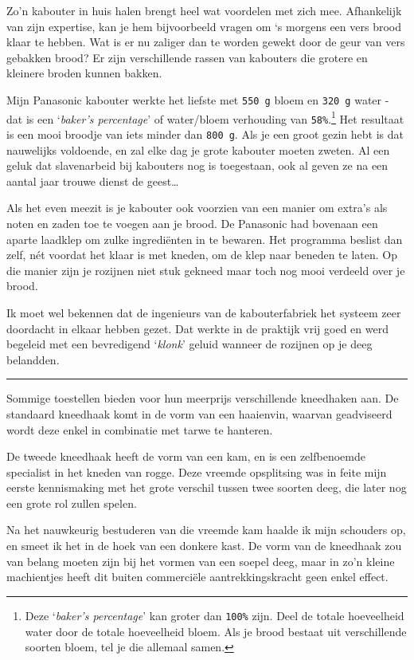 \documentclass[
  11pt,
  dutch,
]{memoir}
\begin{document}
Zo'n kabouter in huis halen brengt heel wat voordelen met zich mee.
Afhankelijk van zijn expertise, kan je hem bijvoorbeeld vragen om `s
morgens een vers brood klaar te hebben. Wat is er nu zaliger dan te
worden gewekt door de geur van vers gebakken brood? Er zijn
verschillende rassen van kabouters die grotere en kleinere broden kunnen
bakken.

Mijn Panasonic kabouter werkte het liefste met \texttt{550\ g} bloem en
\texttt{320\ g} water - dat is een `\emph{baker's percentage}' of
water/bloem verhouding van \texttt{58\%}.\footnote{Deze `\emph{baker's
  percentage}' kan groter dan \texttt{100\%} zijn. Deel de totale
  hoeveelheid water door de totale hoeveelheid bloem. Als je brood
  bestaat uit verschillende soorten bloem, tel je die allemaal samen.}
Het resultaat is een mooi broodje van iets minder dan \texttt{800\ g}.
Als je een groot gezin hebt is dat nauwelijks voldoende, en zal elke dag
je grote kabouter moeten zweten. Al een geluk dat slavenarbeid bij
kabouters nog is toegestaan, ook al geven ze na een aantal jaar trouwe
dienst de geest\ldots{}

Als het even meezit is je kabouter ook voorzien van een manier om
extra's als noten en zaden toe te voegen aan je brood. De Panasonic had
bovenaan een aparte laadklep om zulke ingrediënten in te bewaren. Het
programma beslist dan zelf, nét voordat het klaar is met kneden, om de
klep naar beneden te laten. Op die manier zijn je rozijnen niet stuk
gekneed maar toch nog mooi verdeeld over je brood.

Ik moet wel bekennen dat de ingenieurs van de kabouterfabriek het
systeem zeer doordacht in elkaar hebben gezet. Dat werkte in de praktijk
vrij goed en werd begeleid met een bevredigend `\emph{klonk}' geluid
wanneer de rozijnen op je deeg belandden.

\pfbreak

Sommige toestellen bieden voor hun meerprijs verschillende kneedhaken
aan. De standaard kneedhaak komt in de vorm van een haaienvin, waarvan
geadviseerd wordt deze enkel in combinatie met tarwe te hanteren.

De tweede kneedhaak heeft de vorm van een kam, en is een zelfbenoemde
specialist in het kneden van rogge. Deze vreemde opsplitsing was in
feite mijn eerste kennismaking met het grote verschil tussen twee
soorten deeg, die later nog een grote rol zullen spelen.

Na het nauwkeurig bestuderen van die vreemde kam haalde ik mijn
schouders op, en smeet ik het in de hoek van een donkere kast. De vorm
van de kneedhaak zou van belang moeten zijn bij het vormen van een
soepel deeg, maar in zo'n kleine machientjes heeft dit buiten
commerciële aantrekkingskracht geen enkel effect.
\end{document}
